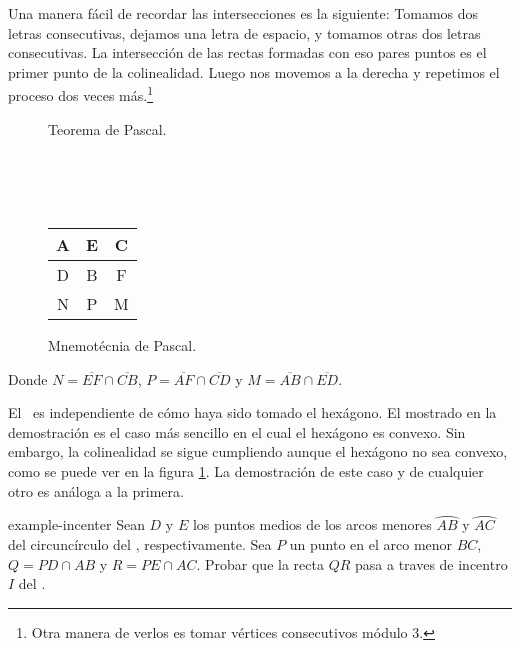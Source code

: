 \begin{remark.tcb}
    Una manera fácil de recordar las intersecciones es la siguiente:
    Tomamos dos letras consecutivas, dejamos una letra de espacio, y tomamos otras dos letras consecutivas.
    La intersección de las rectas formadas con eso pares puntos es el primer punto de la colinealidad.
    Luego nos movemos a la derecha y repetimos el proceso dos veces más.\footnote{Otra manera de verlos es tomar vértices consecutivos módulo 3.}
    \begin{multicols}{2}
        \begin{figure}[H]
            \centering
            
            \caption{Teorema de Pascal.}
            \label{fig:pascal-theorem}
        \end{figure}
        \hfill\\
        \hfill\\
        \hfill\\
        \hfill
        \begin{figure}[H]
            \centering
            \begin{tabular}{|c|c|c|}
                \hline
                A & E & C\\\hline
                D & B & F\\
                \hline \hline
                N & P & M\\
                \hline
            \end{tabular}
            \caption{Mnemotécnia de Pascal.}
        \end{figure}

        Donde $N = \overline{EF} \cap \overline{CB}$, $P = \overline{AF} \cap \overline{CD}$ y $M = \overline{AB} \cap \overline{ED}$.
    \end{multicols}
\end{remark.tcb}


El~ es independiente de cómo haya sido tomado el hexágono.
El mostrado en la demostración es el caso más sencillo en el cual el hexágono es convexo.
Sin embargo, la colinealidad se sigue cumpliendo aunque el hexágono no sea convexo, como se puede ver en la figura \ref{fig:pascal-theorem}.
La demostración de este caso y de cualquier otro es análoga a la primera.

\begin{section-example.tcb}{}{example-incenter}
    Sean $D$ y $E$ los puntos medios de los arcos menores $\wideparen{AB}$ y $\wideparen{AC}$ del circuncírculo del , respectivamente.
    Sea $P$ un punto en el arco menor $BC$, $Q = PD \cap AB$ y $R = PE \cap AC$.
    Probar que la recta $QR$ pasa a traves de incentro $I$ del .
\end{section-example.tcb}

